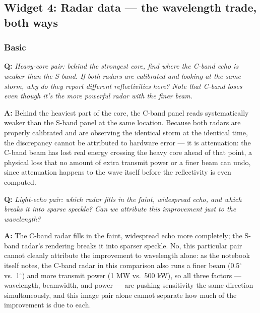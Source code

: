 \documentclass[11pt]{article}
\newenvironment{qa}[1]{\par\noindent\textbf{\color{qgray}Q: }\emph{#1}\par\noindent\textbf{A: }}{\par\vspace{6pt}}
\newcommand{\tier}[1]{\subsubsection*{#1}}
\begin{document}
\subsection{Widget 4: Radar data --- the wavelength trade, both ways}

\tier{Basic}
\begin{qa}{Heavy-core pair: behind the strongest core, find where the C-band echo is weaker than the S-band. If both radars are calibrated and looking at the same storm, why do they report different reflectivities here? Note that C-band loses \emph{even though} it's the more powerful radar with the finer beam.}
Behind the heaviest part of the core, the C-band panel reads systematically weaker than the S-band panel at the same location. Because both radars are properly calibrated and are observing the identical storm at the identical time, the discrepancy cannot be attributed to hardware error --- it is attenuation: the C-band beam has lost real energy crossing the heavy core ahead of that point, a physical loss that no amount of extra transmit power or a finer beam can undo, since attenuation happens to the wave itself before the reflectivity is even computed.
\end{qa}
\begin{qa}{Light-echo pair: which radar fills in the faint, widespread echo, and which breaks it into sparse speckle? Can we attribute this improvement just to the wavelength?}
The C-band radar fills in the faint, widespread echo more completely; the S-band radar's rendering breaks it into sparser speckle. No, this particular pair cannot cleanly attribute the improvement to wavelength alone: as the notebook itself notes, the C-band radar in this comparison also runs a finer beam (0.5$^\circ$ vs.\ 1$^\circ$) and more transmit power (1 MW vs.\ 500 kW), so all three factors --- wavelength, beamwidth, and power --- are pushing sensitivity the same direction simultaneously, and this image pair alone cannot separate how much of the improvement is due to each.
\end{qa}
\end{document}
